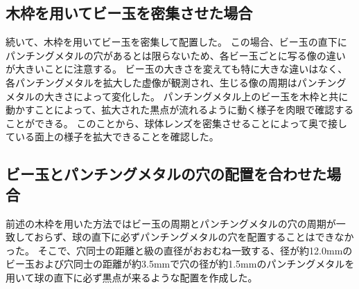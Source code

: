 
\subsection{木枠を用いてビー玉を密集させた場合}
\label{SSWoodframe}


続いて、木枠を用いてビー玉を密集して配置した\figref{}。
この場合、ビー玉の直下にパンチングメタルの穴があるとは限らないため、各ビー玉ごとに写る像の違いが大きいことに注意する。
ビー玉の大きさを変えても特に大きな違いはなく、各パンチングメタルを拡大した虚像が観測され、生じる像の周期はパンチングメタルの大きさによって変化した\figref{}。
パンチングメタル上のビー玉を木枠と共に動かすことによって、拡大された黒点が流れるように動く様子を肉眼で確認することができる。
このことから、球体レンズを密集させることによって奥で接している面上の様子を拡大できることを確認した。

\subsection{ビー玉とパンチングメタルの穴の配置を合わせた場合}
\label{SSMarbleonhole}
前述の木枠を用いた方法ではビー玉の周期とパンチングメタルの穴の周期が一致しておらず、球の直下に必ずパンチングメタルの穴を配置することはできなかった。
そこで、穴同士の距離と級の直径がおおむね一致する、径が約12.0mmのビー玉および穴同士の距離が約3.5mmで穴の径が約1.5mmのパンチングメタルを用いて球の直下に必ず黒点が来るような配置を作成した\figref{}。


